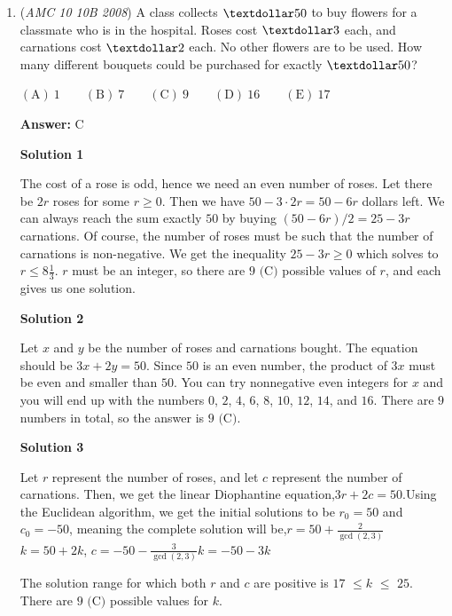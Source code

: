 \begin{enumerate}
 


	\item (\textit{AMC 10 10B 2008}) A class collects $\textdollar50$ to buy flowers for a classmate who is in the hospital. Roses cost $\textdollar3$ each, and carnations cost $\textdollar2$ each. No other flowers are to be used. How many different bouquets could be purchased for exactly $\textdollar50$?


 $\mathrm{(A)}\ 1 \qquad \mathrm{(B)}\ 7 \qquad \mathrm{(C)}\ 9 \qquad \mathrm{(D)}\ 16 \qquad \mathrm{(E)}\ 17$

 \textbf{Answer: }C



\textbf{Solution 1}

The cost of a rose is odd, hence we need an even number of roses. Let there be $2r$ roses for some $r\geq 0$. Then we have $50-3\cdot 2r = 50-6r$ dollars left. We can always reach the sum exactly $50$ by buying $(50-6r)/2 = 25-3r$ carnations. Of course, the number of roses must be such that the number of carnations is non-negative. We get the inequality $25-3r \geq 0$ which solves to $r\leq 8 \frac13$. $r$ must be an integer, so there are $\boxed{9 \text{ (C)}}$ possible values of $r$, and each gives us one solution.

 



\textbf{Solution 2}

Let $x$ and $y$ be the number of roses and carnations bought. The equation should be $3x+2y = 50$. Since $50$ is an even number, the product of $3x$ must be even and smaller than $50$. You can try nonnegative even integers for $x$ and you will end up with the numbers $0$, $2$, $4$, $6$, $8$, $10$, $12$, $14$, and $16$. There are $9$ numbers in total, so the answer is  $\boxed{9 \text{ (C)}}$.

 



\textbf{Solution 3}

Let $r$ represent the number of roses, and let $c$ represent the number of carnations. Then, we get the linear Diophantine equation,$3r+2c=50$.Using the Euclidean algorithm, we get the initial solutions to be $r_0=50$ and $c_0=-50$, meaning the complete solution will be,$r=50+\frac{2}{\gcd(2,3)}$ $k=50+2k$, $c=-50-\frac{3}{\gcd(2,3)}k=-50-3k$

 The solution range for which both $r$ and $c$ are positive is $17$ $\leq k$ $\leq$ $25$. There are $\boxed{9 \text{ (C)}}$ possible values for $k$.


\end{enumerate}
